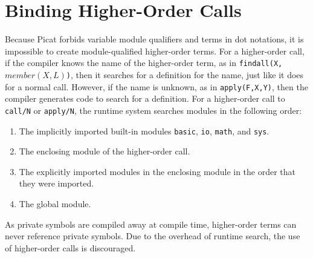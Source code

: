 \section{Binding Higher-Order Calls}
Because Picat forbids variable module qualifiers and terms in dot notations, it is impossible to create module-qualified higher-order terms. For a higher-order call, if the compiler knows the name of the higher-order term, as in \texttt{findall(X,$member(X,L)$)}, then it searches for a definition for the name, just like it does for a normal call. However, if the name is unknown, as in \texttt{apply(F,X,Y)}, then the compiler generates code to search for a definition. For a higher-order call to \texttt{call/N} or \texttt{apply/N}, the runtime system searches modules in the following order:
\begin{enumerate}
\item The implicitly imported built-in modules \texttt{basic}, \texttt{io}, \texttt{math},  and \texttt{sys}.
\item The enclosing module of the higher-order call.
\item The explicitly imported modules in the enclosing module in the order that they were imported.
\item The global module.
\end{enumerate}
As private symbols are compiled away at compile time, higher-order terms can never reference private symbols. Due to the overhead of runtime search, the use of higher-order calls is discouraged.

